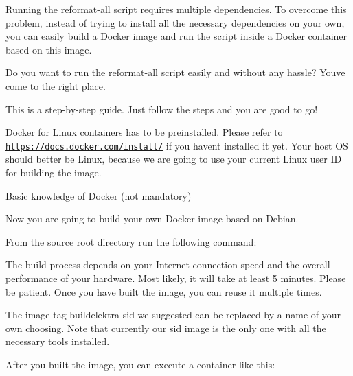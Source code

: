 Running the reformat-\/all script requires multiple dependencies. To overcome this problem, instead of trying to install all the necessary dependencies on your own, you can easily build a Docker image and run the script inside a Docker container based on this image.

Do you want to run the reformat-\/all script easily and without any hassle? You\textquotesingle{}ve come to the right place.

This is a step-\/by-\/step guide. Just follow the steps and you are good to go!


\begin{DoxyItemize}
\item Docker for Linux containers has to be preinstalled. Please refer to \href{https://docs.docker.com/install/}{\texttt{ https\+://docs.\+docker.\+com/install/}} if you haven\textquotesingle{}t installed it yet. Your host OS should better be Linux, because we are going to use your current Linux user ID for building the image.
\item Basic knowledge of Docker (not mandatory)
\end{DoxyItemize}

Now you are going to build your own Docker image based on Debian.

From the source root directory run the following command\+:


\begin{DoxyCode}{0}
\end{DoxyCode}


The build process depends on your Internet connection speed and the overall performance of your hardware. Most likely, it will take at least 5 minutes. Please be patient. Once you have built the image, you can reuse it multiple times.

The image tag {\ttfamily buildelektra-\/sid} we suggested can be replaced by a name of your own choosing. Note that currently our {\ttfamily sid} image is the only one with all the necessary tools installed.

After you built the image, you can execute a container like this\+:


\begin{DoxyCode}{0}
\end{DoxyCode}


